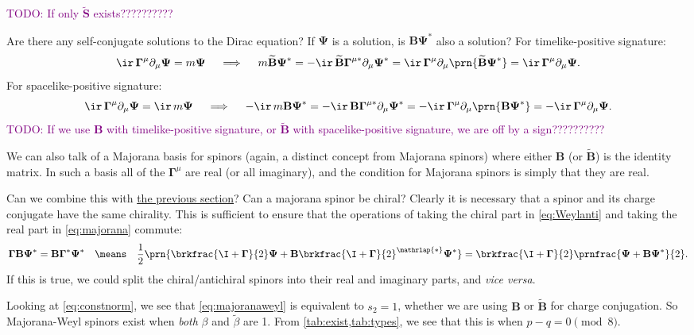 \documentclass[11pt]{article}
\newcommand{\todo}[1]{\textcolor{purple}{TODO: #1}}
\newcommand{\cc}{^\ast}
\newcommand{\Gammab}{\boldsymbol{\Gamma}}
\newcommand{\muc}{^{\mu\ast}}
\renewcommand{\S}{\mathbf{S}}
\newcommand{\B}{\mathbf{B}}
\newcommand{\Bt}{\widetilde{\B}}
\newcommand{\St}{\widetilde{\S}}
\newcommand{\Psib}{\boldsymbol{\Psi}}
\newcommand{\betat}{\tilde{\beta}}
\begin{document}
\todo{If only \(\St\) exists??????????}

Are there any self-conjugate solutions to the Dirac equation?
If \(\Psib\) is a solution, is \(\B \Psib\cc\) also a solution?
For timelike-positive signature:
%
\begin{equation*}
  \ir\, \Gammab^\mu \partial_\mu \Psib = m \Psib
  \quad\implies\quad
  m \Bt \Psib\cc 
    = - \ir\, \Bt \Gammab\muc \partial_\mu \Psib\cc 
    = \ir\, \Gammab^\mu \partial_\mu \prn{\Bt \Psib\cc} 
    = \ir\, \Gammab^\mu \partial_\mu \Psib. 
\end{equation*}
%
For spacelike-positive signature:
%
\begin{equation*}
  \ir\, \Gammab^\mu \partial_\mu \Psib = \ir\, m \Psib
  \quad\implies\quad
  - \ir\, m \B \Psib\cc 
    = - \ir\, \B \Gammab\muc \partial_\mu \Psib\cc 
    = - \ir\, \Gammab^\mu \partial_\mu \prn{\B \Psib\cc} 
    = - \ir\, \Gammab^\mu \partial_\mu \Psib. 
\end{equation*}
%
\todo{If we use \(\B\) with timelike-positive signature, or \(\Bt\) with spacelike-positive signature, we are off by a sign??????????}

We can also talk of a Majorana basis for spinors (again, a distinct concept from Majorana spinors) where either \(\B\) (or \(\Bt\)) is the identity matrix.
In such a basis all of the \(\Gammab^\mu\) are real (or all imaginary), and the condition for Majorana spinors is simply that they are real.

Can we combine this with \hyperref[sec:weyl]{the previous section}?
Can a majorana spinor be chiral?
Clearly it is necessary that a spinor and its charge conjugate  have the same chirality.
This is sufficient to ensure that the operations of taking the chiral part in \cref{eq:Weylanti} and taking the real part in \cref{eq:majorana} commute:
%
\begin{equation}\label{eq:majoranaweyl}
  \Gammab \B \Psib\cc = \B \Gammab\cc \Psib\cc
  \quad\means\quad
  \frac{1}{2}\prn{\brkfrac{\I+\Gammab}{2} \Psib 
    + \B \brkfrac{\I+\Gammab}{2}^{\mathrlap{\ast}} \Psib\cc} 
    = \brkfrac{\I+\Gammab}{2} \prnfrac{\Psib + \B \Psib\cc}{2}.
\end{equation}
%
If this is true, we could split the chiral/antichiral spinors into their real and imaginary parts, and \emph{vice versa}.

Looking at \cref{eq:constnorm}, we see that \cref{eq:majoranaweyl} is equivalent to \(s_2 = 1\), whether we are using \(\B\) or \(\Bt\) for charge conjugation.
So Majorana-Weyl spinors exist when \emph{both} \(\beta\) and \(\betat\) are 1.
From \cref{tab:exist,tab:types}, we see that this is when \( p-q = 0 \pmod 8 \).
\end{document}
